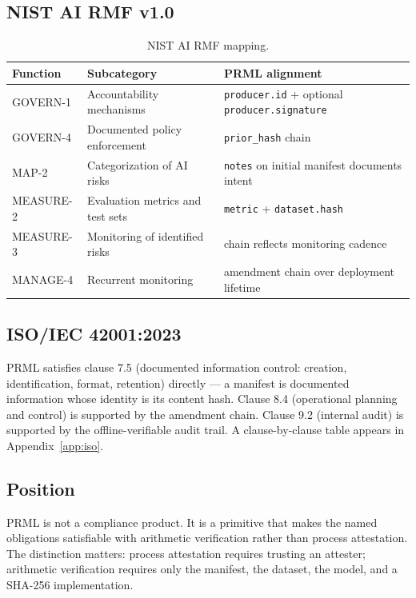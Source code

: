 \documentclass[11pt, a4paper]{article}
\begin{document}
\subsection{NIST AI RMF v1.0}

\begin{table}[h]
\centering
\small
\begin{tabular}{@{}l l p{5.5cm}@{}}
\toprule
Function & Subcategory & PRML alignment \\
\midrule
GOVERN-1 & Accountability mechanisms & \texttt{producer.id} + optional \texttt{producer.signature} \\
GOVERN-4 & Documented policy enforcement & \texttt{prior\_hash} chain \\
MAP-2 & Categorization of AI risks & \texttt{notes} on initial manifest documents intent \\
MEASURE-2 & Evaluation metrics and test sets & \texttt{metric} + \texttt{dataset.hash} \\
MEASURE-3 & Monitoring of identified risks & chain reflects monitoring cadence \\
MANAGE-4 & Recurrent monitoring & amendment chain over deployment lifetime \\
\bottomrule
\end{tabular}
\caption{NIST AI RMF mapping.}
\label{tab:nist}
\end{table}

\subsection{ISO/IEC 42001:2023}

PRML satisfies clause 7.5 (documented information control: creation, identification, format, retention) directly --- a manifest is documented information whose identity is its content hash. Clause 8.4 (operational planning and control) is supported by the amendment chain. Clause 9.2 (internal audit) is supported by the offline-verifiable audit trail. A clause-by-clause table appears in Appendix~\ref{app:iso}.

\subsection{Position}

PRML is not a compliance product. It is a primitive that makes the named obligations satisfiable with arithmetic verification rather than process attestation. The distinction matters: process attestation requires trusting an attester; arithmetic verification requires only the manifest, the dataset, the model, and a SHA-256 implementation.
\end{document}
